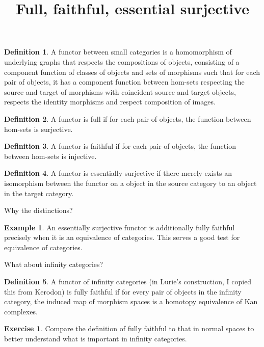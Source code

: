 \documentclass[10pt]{article}
\theoremstyle{plain}%
\theoremstyle{definition}
\newtheorem{definition}{Definition}[section]
\newtheorem{example}{Example}[section]
\newtheorem{exercise}{Exercise}[section]
\theoremstyle{remark}
\begin{document}
\title{Full, faithful, essential surjective}

\maketitle

\begin{definition}
	A functor between small categories is a homomorphism of underlying graphs that respects the compositions of objects, consisting of a component function of classes of objects and sets of morphisms such that for each pair of objects, it has a component function between hom-sets respecting the source and target of morphisms with coincident source and target objects, respects the identity morphisms and respect composition of images.
\end{definition}

\begin{definition}
	A functor is full if for each pair of objects, the function between hom-sets is surjective.
\end{definition}

\begin{definition}
	A functor is faithful if for each pair of objects, the function between hom-sets is injective.
\end{definition}

\begin{definition}
	A functor is essentially surjective if there merely exists an isomorphism between the functor on a object in the source category to an object in the target category.
\end{definition}

Why the distinctions?

\begin{example}
	An essentially surjective functor is additionally fully faithful precisely when it is an equivalence of categories. This serves a good test for equivalence of categories.
\end{example}

What about infinity categories?

\begin{definition}
	A functor of infinity categories (in Lurie's construction, I copied this from Kerodon) is fully faithful if for every pair of objects in the infinity category, the induced map of morphism spaces is a homotopy equivalence of Kan complexes.
\end{definition}

\begin{exercise}
	Compare the definition of fully faithful to that in normal spaces to better understand what is important in infinity categories.
\end{exercise}
\end{document}

